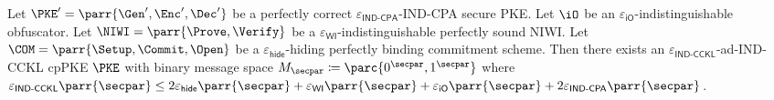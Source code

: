 \begin{theorem}
    Let \(\PKE' = \parr{\Gen',\Enc',\Dec'}\) be a perfectly correct \(\varepsilon_{\textsf{IND-CPA}}\)-IND-CPA secure PKE.
    Let \(\iO\) be an \(\varepsilon_{\textsf{iO}}\)-indistinguishable obfuscator.
    Let \(\NIWI = \parr{\Prove,\Verify}\) be a \(\varepsilon_{\textsf{WI}}\)-indistinguishable perfectly sound NIWI.
    Let \(\COM = \parr{\Setup,\Commit,\Open}\) be a \(\varepsilon_{\textsf{hide}}\)-hiding perfectly binding commitment scheme.
    Then there exists an \(\varepsilon_{\textsf{IND-CCKL}}\)-ad-IND-CCKL cpPKE \(\PKE\) with binary message space \(M_\secpar \coloneq \parc{0^\secpar,1^\secpar}\) where \(\varepsilon_{\textsf{IND-CCKL}}\parr{\secpar} \leq 2\varepsilon_{\textsf{hide}}\parr{\secpar} + \varepsilon_{\textsf{WI}}\parr{\secpar} + \varepsilon_{\textsf{iO}}\parr{\secpar} + 2\varepsilon_{\textsf{IND-CPA}}\parr{\secpar}\).
\end{theorem}

